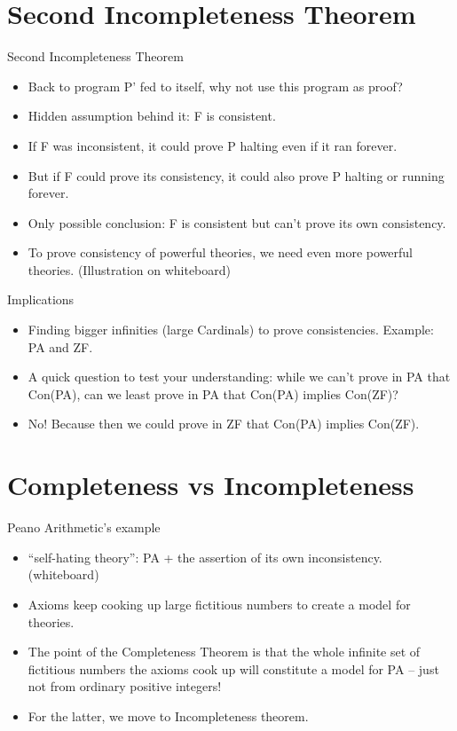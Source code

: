 \documentclass[
    11pt, %
    aspectratio=169, %
]{beamer}
\begin{document}
\section{Second Incompleteness Theorem}
\begin{frame}{Second Incompleteness Theorem}
   \begin{itemize}
    \item Back to program P' fed to itself, why not use this program as proof?
    \item Hidden assumption behind it: F is consistent.
    \item If F was inconsistent, it could prove P halting even if it ran forever.
    \item But if F could prove its consistency, it could also prove P halting or running forever.
    \item Only possible conclusion: F is consistent but can't prove its own consistency.
    \item To prove consistency of powerful theories, we need even more powerful theories. (Illustration on whiteboard)
\end{itemize} 
\end{frame}


\begin{frame}{Implications }
\begin{itemize}
    \item Finding bigger infinities (large Cardinals) to prove consistencies. Example: PA and ZF.
    \item<1-> A quick question to test your understanding: while we can’t prove in PA that Con(PA), can we least prove in PA that Con(PA) implies Con(ZF)?
    \item<2-> No! Because then we could prove in ZF that Con(PA) implies Con(ZF).
\end{itemize}
\end{frame}

\section{Completeness vs Incompleteness}
                      
\begin{frame}{Peano Arithmetic's example}
\subtitle{How do these 2 not cancel each other out?}
\begin{itemize}
    \item “self-hating theory”: PA + the assertion of its own inconsistency. (whiteboard)
    \item Axioms keep cooking up large fictitious numbers to create a model for theories.
    \item The point of the Completeness Theorem is that the whole infinite set of fictitious numbers the axioms cook up will constitute a model for PA – just not from ordinary positive integers!
    \item For the latter, we move to Incompleteness theorem.
\end{itemize}
\end{frame}
\end{document}
